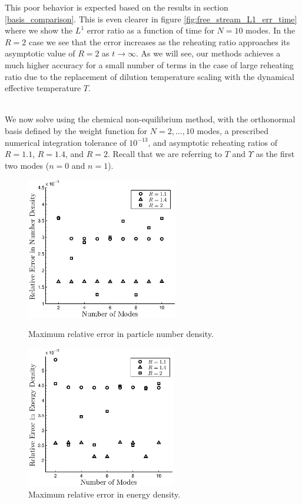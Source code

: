 This poor behavior is expected based on the results in section \ref{basis_comparison}.  This is even clearer in figure \ref{fig:free_stream_L1_err_time} where we show the $L^1$ error ratio as a function of time for $N=10$ modes. In the $R=2$ case we see that the error increases as the reheating ratio approaches its asymptotic value of $R=2$ as $t\rightarrow\infty$.  As we will see, our methods achieves a much higher accuracy for a small number of terms in the case of large reheating ratio due to the replacement of dilution temperature scaling with the dynamical effective temperature $T$.  


\\
We now solve   using the chemical non-equilibrium method, with the orthonormal basis defined by the weight function  for $N=2,...,10$ modes, a prescribed numerical integration tolerance of $10^{-13}$, and asymptotic reheating ratios of $R=1.1$, $R=1.4$, and $R=2$.  Recall that we are referring to $T$ and $\Upsilon$ as the first two modes ($n=0$ and $n=1$). 

\begin{figure}[H]
 \begin{minipage}[b]{0.5\linewidth}
\centerline{\includegraphics[height=6.2cm]{03-birrell/SpectralMethodBoltzmann/keq_num_err.eps}}
\caption{Maximum relative error in particle number density.}\label{fig:keq_num_err}
 \end{minipage}
 \hspace{0.5cm}
 \begin{minipage}[b]{0.5\linewidth}
\centerline{\includegraphics[height=6.2cm]{03-birrell/SpectralMethodBoltzmann/keq_E_err.eps}}
\caption{Maximum relative error in energy density.}\label{fig:keq_E_err}
 \end{minipage}
 \end{figure}

